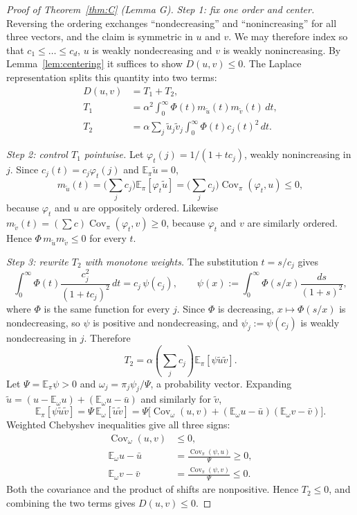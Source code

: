 \documentclass[11pt,a4paper]{article}
\theoremstyle{definition}
\newcommand{\E}{\mathbb{E}}
\newcommand{\Cov}{\operatorname{Cov}}
\begin{document}
\begin{proof}[Proof of Theorem~\ref{thm:C} (Lemma G)]
\emph{Step 1: fix one order and center.}
Reversing the ordering exchanges ``nondecreasing'' and ``nonincreasing'' for all three vectors, and the claim is symmetric in $u$ and $v$. We may therefore index so that $c_1\le\dots\le c_d$, $u$ is weakly nondecreasing and $v$ is weakly nonincreasing. By Lemma~\ref{lem:centering} it suffices to show $D(u,v)\le0$. The Laplace representation splits this quantity into two terms:
\[
\begin{aligned}
D(u,v)&=T_1+T_2,\\
T_1&=\alpha^2\int_0^\infty\Phi(t)m_{\tilde u}(t)m_{\tilde v}(t)\,dt,\\
T_2&=\alpha\sum_j\tilde u_j\tilde v_j
                 \int_0^\infty\Phi(t)c_j(t)^2\,dt.
\end{aligned}
\]

\emph{Step 2: control $T_1$ pointwise.} Let $\varphi_t(j)=1/(1+tc_j)$, weakly nonincreasing in $j$. Since $c_j(t)=c_j\varphi_t(j)$ and $\E_\pi\tilde u=0$,
\[
m_{\tilde u}(t)=\Big(\sum_jc_j\Big)\E_\pi[\varphi_t\tilde u]=\Big(\sum_jc_j\Big)\Cov_\pi(\varphi_t,u)\le0,
\]
because $\varphi_t$ and $u$ are oppositely ordered. Likewise $m_{\tilde v}(t)=(\sum c)\Cov_\pi(\varphi_t,v)\ge0$, because $\varphi_t$ and $v$ are similarly ordered. Hence $\Phi\,m_{\tilde u}m_{\tilde v}\le0$ for every $t$.

\emph{Step 3: rewrite $T_2$ with monotone weights.} The substitution $t=s/c_j$ gives
\[
\int_0^\infty\Phi(t)\frac{c_j^2}{(1+tc_j)^2}\,dt=c_j\,\psi(c_j),\qquad \psi(x):=\int_0^\infty\Phi(s/x)\frac{ds}{(1+s)^2},
\]
where $\Phi$ is the same function for every $j$. Since $\Phi$ is decreasing, $x\mapsto\Phi(s/x)$ is nondecreasing, so $\psi$ is positive and nondecreasing, and $\psi_j:=\psi(c_j)$ is weakly nondecreasing in $j$. Therefore
\[
T_2=\alpha\left(\sum_jc_j\right)\E_\pi[\psi\tilde u\tilde v].
\] Let $\Psi=\E_\pi\psi>0$ and $\omega_j=\pi_j\psi_j/\Psi$, a probability vector. Expanding $\tilde u=(u-\E_\omega u)+(\E_\omega u-\bar u)$ and similarly for $\tilde v$,
\[
\E_\pi[\psi\tilde u\tilde v]=\Psi\,\E_\omega[\tilde u\tilde v]=\Psi\Big[\Cov_\omega(u,v)+(\E_\omega u-\bar u)(\E_\omega v-\bar v)\Big].
\]
Weighted Chebyshev inequalities give all three signs:
\begin{align*}
\Cov_\omega(u,v)&\le0,\\
\E_\omega u-\bar u&=\frac{\Cov_\pi(\psi,u)}\Psi\ge0,\\
\E_\omega v-\bar v&=\frac{\Cov_\pi(\psi,v)}\Psi\le0.
\end{align*}
Both the covariance and the product of shifts are nonpositive. Hence $T_2\le0$, and combining the two terms gives $D(u,v)\le0$.
\end{proof}
\end{document}
